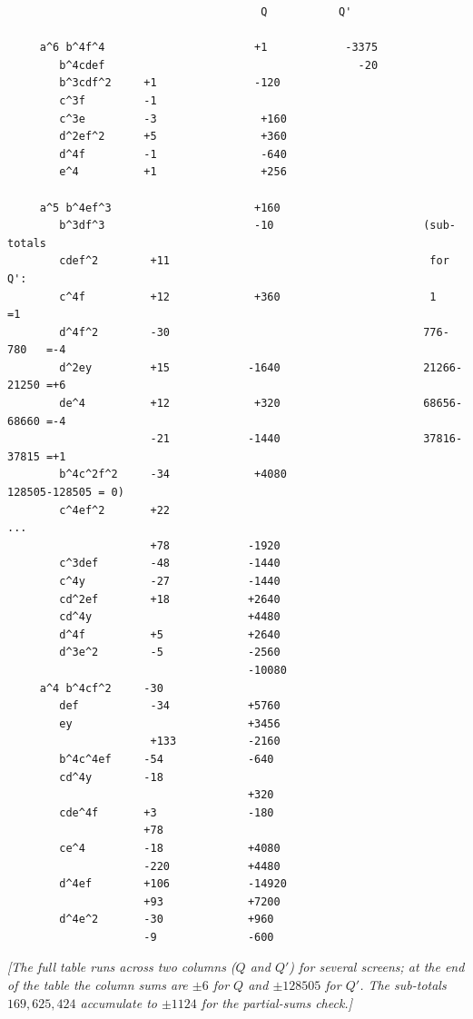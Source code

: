 \documentclass[11pt]{article}
\begin{document}
\begin{small}
\begin{verbatim}
                                       Q           Q'

     a^6 b^4f^4                       +1            -3375
        b^4cdef                                       -20
        b^3cdf^2     +1               -120
        c^3f         -1
        c^3e         -3                +160
        d^2ef^2      +5                +360
        d^4f         -1                -640
        e^4          +1                +256

     a^5 b^4ef^3                      +160
        b^3df^3                       -10                       (sub-totals
        cdef^2        +11                                        for Q':
        c^4f          +12             +360                       1        =1
        d^4f^2        -30                                       776-780   =-4
        d^2ey         +15            -1640                      21266-21250 =+6
        de^4          +12             +320                      68656-68660 =-4
                      -21            -1440                      37816-37815 =+1
        b^4c^2f^2     -34             +4080                     128505-128505 = 0)
        c^4ef^2       +22                                                ...
                      +78            -1920
        c^3def        -48            -1440
        c^4y          -27            -1440
        cd^2ef        +18            +2640
        cd^4y                        +4480
        d^4f          +5             +2640
        d^3e^2        -5             -2560
                                     -10080
     a^4 b^4cf^2     -30
        def           -34            +5760
        ey                           +3456
                      +133           -2160
        b^4c^4ef     -54             -640
        cd^4y        -18
                                     +320
        cde^4f       +3              -180
                     +78
        ce^4         -18             +4080
                     -220            +4480
        d^4ef        +106            -14920
                     +93             +7200
        d^4e^2       -30             +960
                     -9              -600
\end{verbatim}
\end{small}

\textit{[The full table runs across two columns ($Q$ and $Q'$) for several screens; at the end of the table the column sums are $\pm 6$ for $Q$ and $\pm 128505$ for $Q'$. The sub-totals $169, 625, 424$ accumulate to $\pm 1124$ for the partial-sums check.]}
\end{document}
